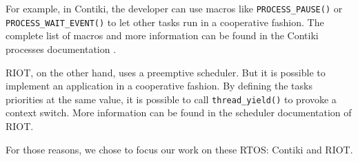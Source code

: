 For example, in Contiki, the developer can use macros like \texttt{PROCESS\_PAUSE()} or \texttt{PROCESS\_WAIT\_EVENT()} to let other tasks run in a cooperative fashion.
The complete list of macros and more information can be found in the Contiki processes documentation \cite{contiki-processes}.

RIOT, on the other hand, uses a preemptive scheduler.
But it is possible to implement an application in a cooperative fashion.
By defining the tasks priorities at the same value, it is possible to call \texttt{thread\_yield()} to provoke a context switch.
More information can be found in the scheduler documentation \cite{riot-scheduler} of RIOT.

For those reasons, we chose to focus our work on these RTOS: Contiki and RIOT.